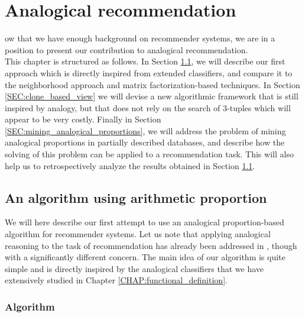\chapter{Analogical recommendation}
\label{CHAP:analogical_recommendation}
\localtableofcontents*
\vspace*{\baselineskip}

ow that we have enough background on recommender systems, we are in
a position to present our contribution to analogical recommendation.\\

This chapter is structured as follows. In Section
\ref{SEC:analogical_reco_basic_algo}, we will describe our first approach which is
directly inspired from extended classifiers, and compare it to the
neighborhood approach and matrix factorization-based techniques. In Section
\ref{SEC:clone_based_view} we will devise a new algorithmic framework that is still
inspired by analogy, but that does not rely on the search of $3$-tuples which
will appear to be very costly. Finally in Section
\ref{SEC:mining_analogical_proportions}, we will address the problem of mining
analogical proportions in partially described databases, and describe how the
solving of this problem can be applied to a recommendation task. This will also
help us to retrospectively analyze the results obtained in Section
\ref{SEC:analogical_reco_basic_algo}.

\section{An algorithm using arithmetic proportion}
\label{SEC:analogical_reco_basic_algo}
We will here describe our first attempt to use an analogical proportion-based
algorithm for recommender systems. Let us note that applying analogical
reasoning to the task of recommendation has already been addressed in
\cite{SakAkaOkaDatTakKamMiyTsu11}, though with a significantly different
concern. The main idea of our algorithm is quite
simple and is directly inspired by the analogical classifiers that we have
extensively studied in Chapter \ref{CHAP:functional_definition}.

\subsection{Algorithm}

